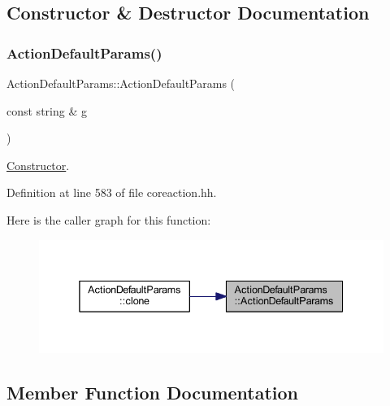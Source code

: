 \subsection{Constructor \& Destructor Documentation}
\mbox{\label{class_action_default_params_a4403cc154f16ac01a6e773e9e43789ce}} 
\subsubsection{\texorpdfstring{ActionDefaultParams()}{ActionDefaultParams()}}
{\footnotesize\ttfamily Action\+Default\+Params\+::\+Action\+Default\+Params (\begin{DoxyParamCaption}\item[{const string \&}]{g }\end{DoxyParamCaption})\hspace{0.3cm}{\ttfamily [inline]}}



\mbox{\hyperlink{class_constructor}{Constructor}}. 



Definition at line 583 of file coreaction.\+hh.

Here is the caller graph for this function\+:
\nopagebreak
\begin{figure}[H]
\begin{center}
\leavevmode
\includegraphics[width=338pt]{class_action_default_params_a4403cc154f16ac01a6e773e9e43789ce_icgraph}
\end{center}
\end{figure}


\subsection{Member Function Documentation}
\mbox{\label{class_action_default_params_a32f4c196d02d9f86c66749b9bf5d2247}} 
